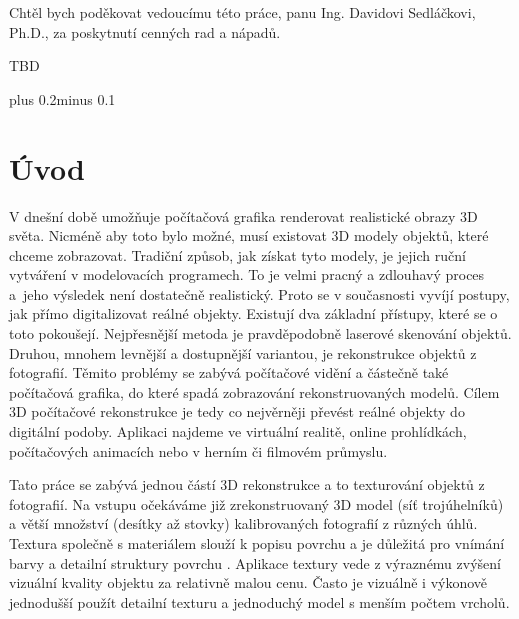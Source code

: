 \documentclass[11pt,twoside,a4paper]{book}
\begin{document}

\coverpagestarts

\acknowledgements \noindent \noindent Chtěl bych poděkovat vedoucímu této práce,
panu Ing. Davidovi Sedláčkovi, Ph.D., za poskytnutí cenných rad a nápadů.

 
\abstractpage
TBD


\tableofcontents

\listoffigures

\listoftables

\mainbodystarts
\normalfont {}\baselineskip plus 0.2\baselineskip minus
0.1\baselineskip


\chapter{Úvod}
V dnešní době umožňuje počítačová grafika renderovat realistické obrazy 3D
světa. Nicméně aby toto bylo možné, musí existovat 3D modely objektů, které
chceme zobrazovat. Tradiční způsob, jak získat tyto modely, je jejich ruční
vytváření v modelovacích programech. To je velmi pracný a zdlouhavý proces
a~jeho výsledek není dostatečně realistický. Proto se v současnosti vyvíjí
postupy, jak přímo digitalizovat reálné objekty. Existují dva základní přístupy,
které se o toto pokoušejí. Nejpřesnější metoda je pravděpodobně laserové
skenování objektů. Druhou, mnohem levnější a dostupnější variantou, je rekonstrukce objektů z
fotografií. Těmito problémy se zabývá počítačové vidění a částečně také
počítačová grafika, do které spadá zobrazování rekonstruovaných modelů. Cílem 3D
počítačové rekonstrukce je tedy co nejvěrněji převést reálné objekty do
digitální podoby. Aplikaci najdeme ve virtuální realitě, online prohlídkách,
počítačových animacích nebo v herním či filmovém průmyslu.

Tato práce se zabývá jednou částí 3D rekonstrukce a to texturování objektů z
fotografií. Na vstupu očekáváme již zrekonstruovaný 3D model (síť trojúhelníků)
a větší množství (desítky až stovky) kalibrovaných fotografií z různých úhlů. Textura společně s materiálem slouží k popisu povrchu a je důležitá pro vnímání barvy a detailní struktury povrchu \cite{mpg}. Aplikace textury vede z výraznému zvýšení vizuální kvality objektu za relativně malou cenu.  Často je vizuálně i výkonově jednodušší použít detailní texturu a jednoduchý model s menším počtem vrcholů.
\end{document}
